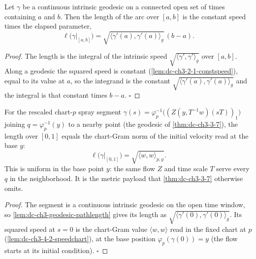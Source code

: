 \begin{lemma}
  \label{lem:dc-ch3-geodesic-pathlength}
  \leanok
  Let $\gamma$ be a continuous intrinsic geodesic on a connected open set of times containing
  $a$ and $b$. Then the length of the arc over $[a,b]$ is the constant speed times the elapsed
  parameter,
  \[
    \ell\big(\gamma|_{[a,b]}\big)=\sqrt{\langle\gamma'(a),\gamma'(a)\rangle_g}\,(b-a).
  \]
\end{lemma}
\begin{proof}
  \leanok
  The length is the integral of the intrinsic speed $\sqrt{\langle\gamma',\gamma'\rangle_g}$ over
  $[a,b]$. Along a geodesic the squared speed is constant (\cref{lem:dc-ch3-2-1-constspeed}), equal
  to its value at $a$, so the integrand is the constant $\sqrt{\langle\gamma'(a),\gamma'(a)\rangle_g}$
  and the integral is that constant times $b-a$. $\square$
\end{proof}

\begin{lemma}
  \label{lem:dc-ch3-4-2-segment-length}
  \leanok
  For the rescaled chart-$p$ spray segment $\gamma(s)=\varphi_p^{-1}\big((Z(y,T^{-1}w)(sT))_1\big)$
  joining $q=\varphi_p^{-1}(y)$ to a nearby point (the geodesic of \cref{thm:dc-ch3-3-7}), the length
  over $[0,1]$ equals the chart-Gram norm of the initial velocity read at the base $y$:
  \[
    \ell\big(\gamma|_{[0,1]}\big)=\sqrt{\langle w,w\rangle_{p,y}}.
  \]
  This is uniform in the base point $y$: the same flow $Z$ and time scale $T$ serve every $q$ in the
  neighborhood. It is the metric payload that \cref{thm:dc-ch3-3-7} otherwise omits.
\end{lemma}
\begin{proof}
  \leanok
  The segment is a continuous intrinsic geodesic on the open time window, so
  \cref{lem:dc-ch3-geodesic-pathlength} gives its length as
  $\sqrt{\langle\gamma'(0),\gamma'(0)\rangle_g}$. Its squared speed at $s=0$ is the chart-Gram value
  $\langle w,w\rangle$ read in the fixed chart at $p$ (\cref{lem:dc-ch3-4-2-speedchart}), at the base
  position $\varphi_p(\gamma(0))=y$ (the flow starts at its initial condition). $\square$
\end{proof}

